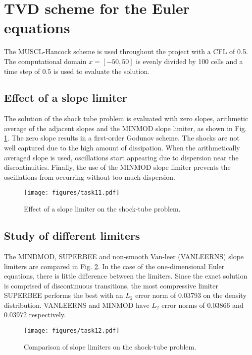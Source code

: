 \documentclass[letterpaper,12pt,]{article}
\begin{document}


\section{TVD scheme for the Euler equations}

The MUSCL-Hancock scheme is used throughout the project with a CFL of 0.5.
The computational domain $x = [-50,50]$ is evenly divided by 100 cells and a time step of 0.5 is used to evaluate the solution.


\subsection{Effect of a slope limiter}

The solution of the shock tube problem is evaluated with zero slopes, arithmetic average of the adjacent slopes and the MINMOD slope limiter, as shown in Fig. \ref{fig:task11}.
The zero slope results in a first-order Godunov scheme.
The shocks are not well captured due to the high amount of dissipation.
When the arithmetically averaged slope is used, oscillations start appearing due to dispersion near the discontinuities.
Finally, the use of the MINMOD slope limiter prevents the oscillations from occurring without too much dispersion.

\begin{figure}[htb]%
    \texttt{[image: figures/task11.pdf]}
    \caption{Effect of a slope limiter on the shock-tube problem.}
    \label{fig:task11}
\end{figure}

\subsection{Study of different limiters}
The MINDMOD, SUPERBEE and non-smooth Van-leer (VANLEERNS) slope limiters are compared in Fig. \ref{fig:task12}.
In the case of the one-dimensional Euler equations, there is little difference between the limiters.
Since the exact solution is comprised of discontinuous transitions, the most compressive limiter SUPERBEE performs the best with an $L_2$ error norm of 0.03793 on the density distribution.
VANLEERNS and MINMOD have $L_2$ error norms of 0.03866 and 0.03972 respectively.

\begin{figure}[htb]%
    \texttt{[image: figures/task12.pdf]}
    \caption{Comparison of slope limiters on the shock-tube problem.}
    \label{fig:task12}
\end{figure}
\end{document}
